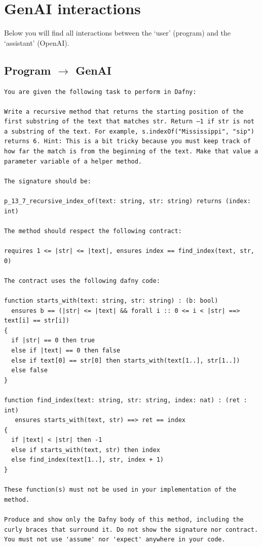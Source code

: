 \documentclass{article}
\begin{document}
\section*{GenAI interactions}
Below you will find all interactions between the `user' (program) and the `assistant' (OpenAI).
\subsection*{Program $\rightarrow$ GenAI}
\begin{lstlisting}
You are given the following task to perform in Dafny:

Write a recursive method that returns the starting position of the first substring of the text that matches str. Return –1 if str is not a substring of the text. For example, s.indexOf("Mississippi", "sip") returns 6. Hint: This is a bit tricky because you must keep track of how far the match is from the beginning of the text. Make that value a parameter variable of a helper method.

The signature should be:

p_13_7_recursive_index_of(text: string, str: string) returns (index: int)

The method should respect the following contract:

requires 1 <= |str| <= |text|, ensures index == find_index(text, str, 0)

The contract uses the following dafny code:

function starts_with(text: string, str: string) : (b: bool)
  ensures b == (|str| <= |text| && forall i :: 0 <= i < |str| ==> text[i] == str[i])
{
  if |str| == 0 then true
  else if |text| == 0 then false
  else if text[0] == str[0] then starts_with(text[1..], str[1..])
  else false
}

function find_index(text: string, str: string, index: nat) : (ret : int)
   ensures starts_with(text, str) ==> ret == index 
{
  if |text| < |str| then -1
  else if starts_with(text, str) then index
  else find_index(text[1..], str, index + 1)
}

These function(s) must not be used in your implementation of the method.

Produce and show only the Dafny body of this method, including the curly braces that surround it. Do not show the signature nor contract. You must not use 'assume' nor 'expect' anywhere in your code.
\end{lstlisting}
\end{document}
